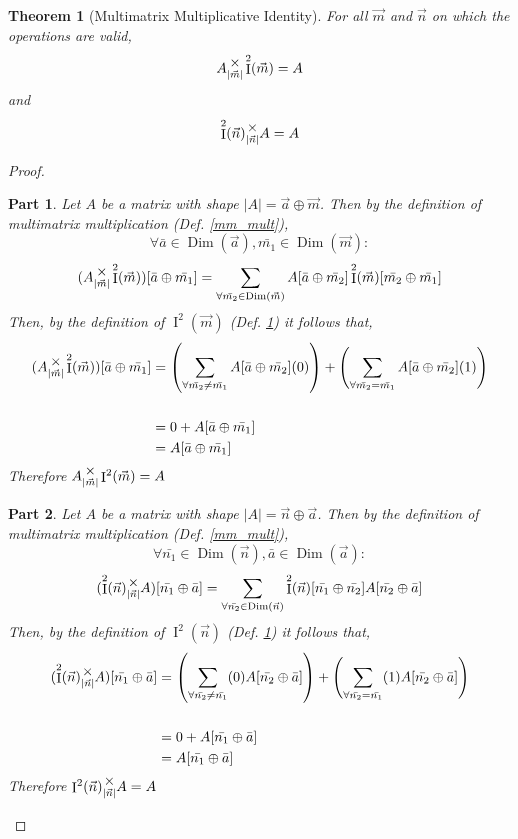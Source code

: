 \documentclass[12pt]{book}
\theoremstyle{definition}
\theoremstyle{plain}
\newtheorem{theorem}{Theorem}[chapter]
\theoremstyle{ppart}
\newtheorem{ppart}{Part}
\theoremstyle{case}
\theoremstyle{solution}
\DeclareMathOperator{\Dim}{Dim}
\DeclareMathOperator{\Ident}{I}
\newcommand{\mmult}[1]{\text{\raisebox{1ex}{$\underset{#1}{\times}$}}}
\begin{document}
\begin{theorem}[Multimatrix Multiplicative Identity]
\label{mm_ident}
For all $\vec{m}$ and $\vec{n}$ on which the operations are valid,
\[
 A \mmult{|\vec{m}|} \Ident^2(\vec{m}) = A
\]
and
\[
 \Ident^2(\vec{n}) \mmult{|\vec{n}|} A = A
\]
\end{theorem}
\begin{proof}
\begin{ppart}
Let $A$ be a matrix with shape $|A| = \vec{a} \oplus \vec{m}$.
Then by the definition of multimatrix multiplication (Def. \ref{mm_mult}),
\[ \forall \bar{a} \in \Dim(\vec{a}), \bar{m_1} \in \Dim(\vec{m}) : \]
\[
 (A \mmult{|\vec{m}|} \Ident^2(\vec{m}))[\bar{a} \oplus \bar{m_1}]
 =
 \sum_{\forall \bar{m_2} \in \Dim(\vec{m})}
 A[\bar{a} \oplus \bar{m_2}] \Ident^2(\vec{m})[\bar{m_2} \oplus \bar{m_1}]
\]
Then, by the definition of $\Ident^2(\vec{m})$ (Def. \ref{mm_ident}) it follows
that,
\begin{align*}
 (A \mmult{|\vec{m}|} \Ident^2(\vec{m}))[\bar{a} \oplus \bar{m_1}]
 &=
 \left(
  \sum_{\forall \bar{m_2} \ne \bar{m_1}}
  A[\bar{a} \oplus \bar{m_2}] (0)
 \right)
 +
 \left(
  \sum_{\forall \bar{m_2} = \bar{m_1}}
  A[\bar{a} \oplus \bar{m_2}] (1)
 \right) \\
 \\
 &= 0 + A[\bar{a} \oplus \bar{m_1}] \\
 &= A[\bar{a} \oplus \bar{m_1}]
\end{align*}
Therefore $A \mmult{|\vec{m}|} \Ident^2(\vec{m}) = A$
\end{ppart}
\begin{ppart}
Let $A$ be a matrix with shape $|A| = \vec{n} \oplus \vec{a}$.
Then by the definition of multimatrix multiplication (Def. \ref{mm_mult}),
\[ \forall  \bar{n_1} \in \Dim(\vec{n}), \bar{a} \in \Dim(\vec{a}) : \]
\[
 (\Ident^2(\vec{n}) \mmult{|\vec{n}|} A)[\bar{n_1} \oplus \bar{a}]
 =
 \sum_{\forall \bar{n_2} \in \Dim(\vec{n})}
 \Ident^2(\vec{n})[\bar{n_1} \oplus \bar{n_2}]A[\bar{n_2} \oplus \bar{a}] 
\]
Then, by the definition of $\Ident^2(\vec{n})$ (Def. \ref{mm_ident}) it follows
that,
\begin{align*}
 (\Ident^2(\vec{n}) \mmult{|\vec{n}|} A)[\bar{n_1} \oplus \bar{a}]
 &=
 \left(
  \sum_{\forall \bar{n_2} \ne \bar{n_1}}
  (0) A[\bar{n_2} \oplus \bar{a}]
 \right)
 +
 \left(
  \sum_{\forall \bar{n_2} = \bar{n_1}}
  (1) A[\bar{n_2} \oplus \bar{a}]
 \right) \\
 \\
 &= 0 + A[\bar{n_1} \oplus \bar{a}] \\
 &= A[\bar{n_1} \oplus \bar{a}]
\end{align*}
Therefore $\Ident^2(\vec{n}) \mmult{|\vec{n}|} A = A$
\end{ppart}
\end{proof}
\end{document}
